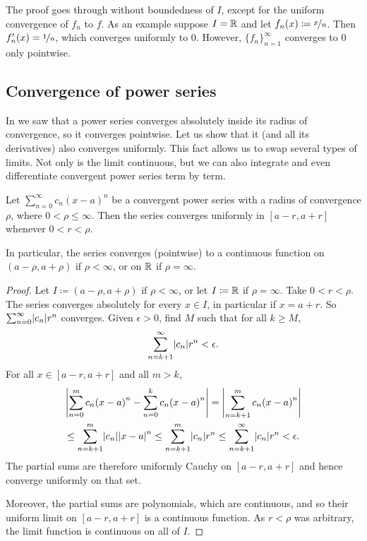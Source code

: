 The proof goes through without boundedness of $I$, except for the
uniform convergence of $f_n$ to $f$.  As an example suppose $I = {\mathbb{R}}$ and let
$f_n(x) \coloneqq \nicefrac{x}{n}$.  Then $f_n'(x)=\nicefrac{1}{n}$, which
converges uniformly to $0$.  However, $\{f_n\}_{n=1}^\infty$ converges to 0 only pointwise.

\subsection{Convergence of power series}

In  we saw that a power series converges
absolutely inside its radius of convergence, so it converges pointwise.
Let us show that it (and all its derivatives) also converges uniformly.
This fact allows us to
swap several types of limits.  Not only is the limit continuous,
but we can also
integrate and even differentiate convergent power series term by term.

\begin{prop}
Let $\sum_{n=0}^\infty c_n {(x-a)}^n$ be a convergent power series with a radius
of convergence $\rho$, where $0 < \rho \leq \infty$.
Then the series converges uniformly
in $[a-r,a+r]$ whenever $0 < r < \rho$.

In particular, the series converges (pointwise) to a continuous function
on $(a-\rho,a+\rho)$ if $\rho < \infty$, or on ${\mathbb{R}}$ if $\rho = \infty$.
\end{prop}

\begin{proof}
Let $I \coloneqq (a-\rho,a+\rho)$ if $\rho < \infty$,
or let $I \coloneqq {\mathbb{R}}$ if $\rho= \infty$.
Take $0 < r < \rho$.
The series converges absolutely for every $x \in I$,
in particular if $x = a+r$.
So $\sum_{n=0}^\infty \lvert {c_n} \rvert r^n$ converges.
Given $\epsilon >0$, find $M$ such that for all $k \geq M$,
\begin{equation*}
\sum_{n=k+1}^\infty \lvert {c_n} \rvert {r}^n < \epsilon .
\end{equation*}
For all $x \in [a-r,a+r]$ and all $m > k$,
\begin{multline*}
\left\lvert {\sum_{n=0}^m c_n {(x-a)}^n - 
\sum_{n=0}^k c_n {(x-a)}^n} \right\rvert
=
\left\lvert {\sum_{n=k+1}^m c_n {(x-a)}^n} \right\rvert
\\
\leq
\sum_{n=k+1}^m \lvert {c_n} \rvert {\lvert {x-a} \rvert}^n
\leq
\sum_{n=k+1}^m \lvert {c_n} \rvert {r}^n
\leq
\sum_{n=k+1}^\infty \lvert {c_n} \rvert {r}^n
<\epsilon.
\end{multline*}
The partial sums are therefore uniformly Cauchy on $[a-r,a+r]$ and
hence converge uniformly on that set.

Moreover, the partial sums are polynomials, which are
continuous, and so their uniform limit on $[a-r,a+r]$
is a continuous function.
As $r < \rho$ was arbitrary, the limit function
is continuous on all of $I$.
\end{proof}

